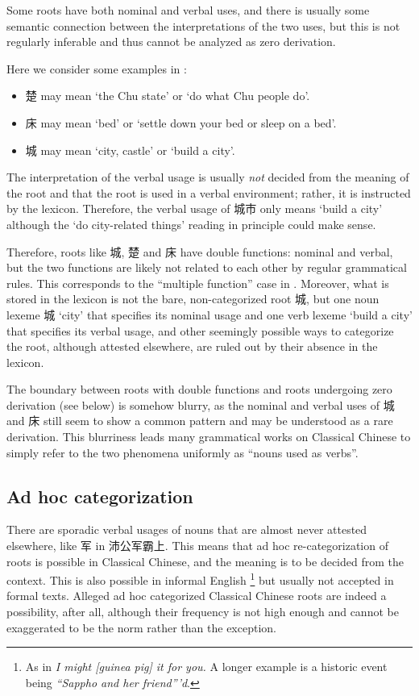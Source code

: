 \documentclass[UTF8, a4paper, oneside, scheme=plain, 12pt]{ctexrep}
\newcommand*{\citesec}[1]{\S~{#1}}
\newcommand{\form}[1]{\emph{#1}}
\newcommand{\translate}[1]{`#1'}
\begin{document}
Some roots have both nominal and verbal uses,
and there is usually some semantic connection between the interpretations of the two uses,
but this is not regularly inferable and thus cannot be analyzed as zero derivation.

Here we consider some examples in \citet{yang1991dict}:
\begin{itemize}
    \item 楚 may mean \translate{the Chu state} or \translate{do what Chu people do}.
    \item 床 may mean \translate{bed} or \translate{settle down your bed or sleep on a bed}.
    \item 城 may mean \translate{city, castle} or \translate{build a city}.
\end{itemize}

The interpretation of the verbal usage is usually \emph{not} decided
from the meaning of the root and that the root is used in a verbal environment;
rather, it is instructed by the lexicon.
Therefore, the verbal usage of 城市 only means \translate{build a city}
although the \translate{do city-related things} reading in principle could make sense. 

Therefore, roots like 城, 楚 and 床 have double functions: nominal and verbal,
but the two functions are likely not related to each other by regular grammatical rules.
This corresponds to the ``multiple function'' case in \citet[\citesec{11.3}]{dixon2010basic2}.
Moreover, what is stored in the lexicon is not the bare, non-categorized root 城,
but one noun lexeme 城 \translate{city} that specifies its nominal usage 
and one verb lexeme \translate{build a city} that specifies its verbal usage,
and other seemingly possible ways to categorize the root, although attested elsewhere,
are ruled out by their absence in the lexicon.

The boundary between roots with double functions and roots undergoing zero derivation (see below) 
is somehow blurry,
as the nominal and verbal uses of 城 and 床 still seem to show a common pattern
and may be understood as a rare derivation.
This blurriness leads many grammatical works on Classical Chinese 
to simply refer to the two phenomena uniformly as ``nouns used as verbs''.

\subsection{Ad hoc categorization}

There are sporadic verbal usages of nouns that are almost never attested elsewhere,
like 军 in 沛公军霸上.
This means that ad hoc re-categorization of roots is possible in Classical Chinese,
and the meaning is to be decided from the context.
This is also possible in informal English%
\footnote{
    As in \form{I might [guinea pig] it for you.}
    A longer example is a historic event being \form{``Sappho and her friend'''d}.
} 
but usually not accepted in formal texts.
Alleged ad hoc categorized Classical Chinese roots are indeed a possibility, after all,
although their frequency is not high enough and cannot be exaggerated to be the norm rather than the exception.
\end{document}
